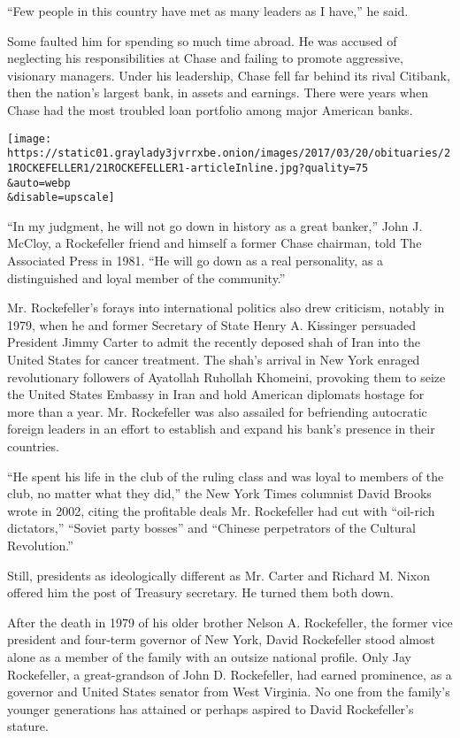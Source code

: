 ``Few people in this country have met as many leaders as I have,'' he
said.

Some faulted him for spending so much time abroad. He was accused of
neglecting his responsibilities at Chase and failing to promote
aggressive, visionary managers. Under his leadership, Chase fell far
behind its rival Citibank, then the nation's largest bank, in assets and
earnings. There were years when Chase had the most troubled loan
portfolio among major American banks.

\texttt{[image: https://static01.graylady3jvrrxbe.onion/images/2017/03/20/obituaries/21ROCKEFELLER1/21ROCKEFELLER1-articleInline.jpg?quality=75\\\&auto=webp\\\&disable=upscale]}

``In my judgment, he will not go down in history as a great banker,''
John J. McCloy, a Rockefeller friend and himself a former Chase
chairman, told The Associated Press in 1981. ``He will go down as a real
personality, as a distinguished and loyal member of the community.''

Mr. Rockefeller's forays into international politics also drew
criticism, notably in 1979, when he and former Secretary of State Henry
A. Kissinger persuaded President Jimmy Carter to admit the recently
deposed shah of Iran into the United States for cancer treatment. The
shah's arrival in New York enraged revolutionary followers of Ayatollah
Ruhollah Khomeini, provoking them to seize the United States Embassy in
Iran and hold American diplomats hostage for more than a year. Mr.
Rockefeller was also assailed for befriending autocratic foreign leaders
in an effort to establish and expand his bank's presence in their
countries.

``He spent his life in the club of the ruling class and was loyal to
members of the club, no matter what they did,'' the New York Times
columnist David Brooks wrote in 2002, citing the profitable deals Mr.
Rockefeller had cut with ``oil-rich dictators,'' ``Soviet party bosses''
and ``Chinese perpetrators of the Cultural Revolution.''

Still, presidents as ideologically different as Mr. Carter and Richard
M. Nixon offered him the post of Treasury secretary. He turned them both
down.

After the death in 1979 of his older brother Nelson A. Rockefeller, the
former vice president and four-term governor of New York, David
Rockefeller stood almost alone as a member of the family with an outsize
national profile. Only Jay Rockefeller, a great-grandson of John D.
Rockefeller, had earned prominence, as a governor and United States
senator from West Virginia. No one from the family's younger generations
has attained or perhaps aspired to David Rockefeller's stature.

